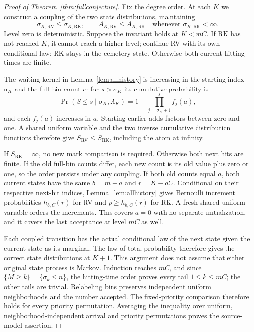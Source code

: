 \documentclass[11pt]{article}
\newcommand{\RV}{\mathrm{RV}}
\newcommand{\RK}{\mathrm{RK}}
\begin{document}
\begin{proof}[Proof of Theorem~\ref{thm:fullconjecture}]
Fix the degree order. At each $K$ we construct a coupling of the two
state distributions, maintaining
\[
 \sigma_{K,\RV}\leq\sigma_{K,\RK},\qquad
 A_{K,\RV}\leq A_{K,\RK}
 \quad\text{whenever }\sigma_{K,\RK}<\infty.
\]
Level zero is deterministic. Suppose the invariant holds at $K<mC$.
If RK has not reached $K$, it cannot reach a higher level; continue
RV with its own conditional law; RK stays in the cemetery state.
Otherwise both current hitting times are finite.

The waiting kernel in Lemma~\ref{lem:allhistory} is increasing in
the starting index $\sigma_K$ and the full-bin count $a$: for
$s>\sigma_K$ its cumulative probability is
\[
 \Pr(S\leq s\mid\sigma_K,A_K)
       =1-\prod_{j=\sigma_K+1}^s f_j(a),
\]
and each $f_j(a)$ increases in $a$. Starting earlier adds factors
between zero and one. A shared uniform variable and the two inverse
cumulative distribution functions therefore give
$S_\RV\leq S_\RK$, including the atom at infinity.

If $S_\RK=\infty$, no new mark comparison is required. Otherwise
both next hits are finite. If the old full-bin counts differ, each
new count is its old value plus zero or one, so the order persists
under any coupling. If both old counts equal $a$, both current states
have the same $b=m-a$ and $r=K-aC$. Conditional on their respective
next-hit indices, Lemma~\ref{lem:allhistory} gives Bernoulli
increment probabilities $h_{b,C}(r)$ for RV and $p\geq h_{b,C}(r)$
for RK. A fresh shared uniform variable orders the increments.
This covers $a=0$ with no separate initialization, and it covers
the last acceptance at level $mC$ as well.

Each coupled transition has the actual conditional law of the next
state given the current state as its marginal. The law of total
probability therefore gives the correct state distributions at $K+1$.
This argument does not assume that either original state process is
Markov. Induction reaches $mC$, and since $\{M\geq k\}=\{\sigma_k\leq n\}$, the hitting-time order
proves every tail $1\leq k\leq mC$; the other tails are trivial.
Relabeling bins preserves independent uniform neighborhoods and the
number accepted. The fixed-priority comparison therefore holds for
every priority permutation. Averaging the inequality over uniform,
neighborhood-independent arrival and priority permutations proves
the source-model assertion.
\end{proof}
\end{document}

